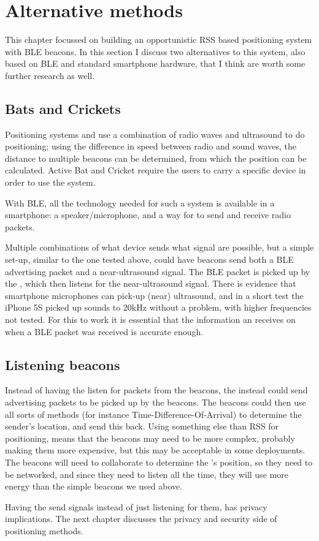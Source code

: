 \section{Alternative methods}
\label{sec:architecture-alternative}
This chapter focussed on building an opportunistic RSS based positioning system with BLE beacons.
In this section I discuss two alternatives to this system, also based on BLE and standard smartphone hardware, that I think are worth some further research as well.

\subsection{\BLE Bats and Crickets}
\label{sec:architecture-bats}

Positioning systems  \citep{harter2002anatomy} and  \citep{priyantha2000cricket} use a combination of radio waves and ultrasound to do positioning; using the difference in speed between radio and sound waves, the distance to multiple beacons can be determined, from which the position can be calculated.
Active Bat and Cricket require the users to carry a specific device in order to use the system.

With BLE, all the technology needed for such a system is available in a smartphone: a speaker/microphone, and a way for \apps to send and receive radio packets.

Multiple combinations of what device sends what signal are possible, but a simple set-up, similar to the one tested above, could have beacons send both a BLE advertising packet and a near-ultrasound signal.
The BLE packet is picked up by the \device, which then listens for the near-ultrasound signal.
There is evidence that smartphone microphones can pick-up (near) ultrasound\citep{arentz2011near,bihler2011smartguide}, and in a short test the iPhone 5S picked up sounds to 20kHz without a problem, with higher frequencies not tested.
For this to work it is essential that the information an \app receives on when a BLE packet was received is accurate enough.

\subsection{Listening beacons}
Instead of having the \device listen for packets from the beacons, the \device instead could send advertising packets to be picked up by the beacons.
The beacons could then use all sorts of methods (for instance Time-Difference-Of-Arrival) to determine the sender's location, and send this back.
Using something else than RSS for positioning, means that the beacons may need to be more complex, probably making them more expensive, but this may be acceptable in some deployments.
The beacons will need to collaborate to determine the \device's position, so they need to be networked, and since they need to listen all the time, they will use more energy than the simple beacons we used above.

Having the \device send signals instead of just listening for them, has privacy implications.
The next chapter discusses the privacy and security side of positioning methods.

